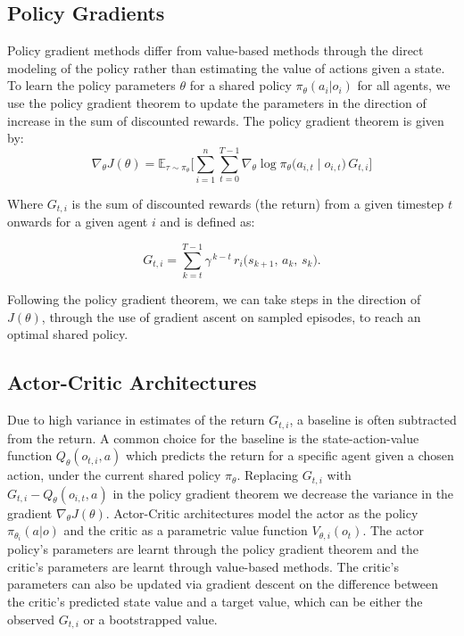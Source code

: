 \documentclass[conference]{IEEEtran}
\begin{document}

\subsection{Policy Gradients}
\noindent Policy gradient methods differ from value-based methods through the direct modeling of the policy rather than estimating the value of actions given a state. To learn the policy parameters $\theta$ for a shared policy $\pi_{\theta}(a_i|o_i)$ for all agents, we use the policy gradient theorem to update the parameters in the direction of increase in the sum of discounted rewards. The policy gradient theorem is given by: 
\begin{equation}
\nabla_{\theta} J(\theta) = \mathbb{E}_{\tau \sim \pi_{\theta}} \Biggl[ \sum_{i=1}^{n} \sum_{t=0}^{T-1} \nabla_{\theta} \log \pi_{\theta} \bigl(a_{i,t} \mid o_{i,t} \bigr) \, G_{t,i} \Biggr]
\end{equation}

Where $G_{t,i}$ is the sum of discounted rewards (the return) from a given timestep $t$ onwards for a given agent $i$ and is defined as:

\begin{equation}
G_{t,i} = \sum_{k=t}^{T-1} \gamma^{\,k - t} \, r_i\bigl(s_{k+1}, \, a_k, \, s_k\bigr).
\end{equation}

Following the policy gradient theorem, we can take steps in the direction of $J(\theta)$, through the use of gradient ascent on sampled episodes, to reach an optimal shared policy.


\subsection{Actor-Critic Architectures}
\noindent Due to high variance in estimates of the return $G_{t,i}$, a baseline is often subtracted from the return. A common choice for the baseline is the state-action-value function $Q_{\theta}(o_{t,i}, a)$ which predicts the return for a specific agent given a chosen action, under the current shared policy $\pi_{\theta} $. Replacing $G_{t,i}$ with $G_{t,i} - Q_{\theta}(o_{i,t}, a)$ in the policy gradient theorem we decrease the variance in the gradient 
$\nabla_{\theta} J({\theta})$.
Actor-Critic architectures model the actor as the policy $\pi_{\theta_i}(a|o)$ and the critic as a parametric value function $V_{\theta,i}(o_t)$. The actor policy's parameters are learnt through the policy gradient theorem and the critic's parameters are learnt through value-based methods. The critic's parameters can also be updated via gradient descent on the difference between the critic's predicted state value and a target value, which can be either the observed $G_{t,i}$ or a bootstrapped value.
\end{document}
